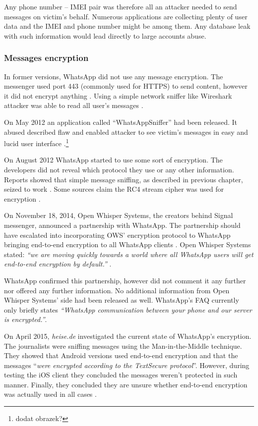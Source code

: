 \documentclass[thesis=M,english]{FITthesis}[2012/10/20]
\begin{document}
Any phone number -- IMEI pair was therefore all an attacker needed to send messages on victim's behalf. Numerous applications are collecting plenty of user data and the IMEI and phone number might be among them. Any database leak with such information would lead directly to large accounts abuse.

\subsubsection{Messages encryption}

In former versions, WhatsApp did not use any message encryption. The messenger used port 443 (commonly used for HTTPS) to send content, however it did not encrypt anything \cite{whatsapp-plaintext}. Using a simple network sniffer like Wireshark attacker was able to read all user's messages \cite{whatsapp-plaintext}.

On May 2012 an application called ``WhatsAppSniffer'' had been released. It abused described flaw and enabled attacker to see victim's messages in easy and lucid user interface \cite{whatsapp-sniffer}\cite{whatsapp-sniffer2}.\footnote{dodat obrazek?}

On August 2012 WhatsApp started to use some sort of encryption. The developers did not reveal which protocol they use or any other information. Reports showed that simple message sniffing, as described in previous chapter, seized to work \cite{whatsapp-sniffernomore}. Some sources claim the  RC4 stream cipher was used for encryption \cite{whatsapp-rc4}\cite{whatsapp-rc42}.

On November 18, 2014, Open Whisper Systems, the creators behind Signal messenger, announced a partnership with WhatsApp. The partnership should have escalated into incorporating OWS' encryption protocol to WhatsApp bringing end-to-end encryption to all WhatsApp clients \cite{openwhisperwhatsapp}. Open Whisper Systems stated: \emph{``we are moving quickly towards a world where all WhatsApp users will get end-to-end encryption by default.''} \cite{openwhisperwhatsapp}.

WhatsApp confirmed this partnership, however did not comment it any further nor offered any further information. No additional information from Open Whisper Systems' side had been released as well. WhatsApp's FAQ currently only briefly states \emph{``WhatsApp communication between your phone and our server is encrypted.''}\cite{whatsapp-faq}.

On April 2015, \emph{heise.de} investigated the current state of WhatsApp's encryption. The journalists were sniffing messages using the Man-in-the-Middle technique. They showed that Android versions used end-to-end encryption and that the messages ``\emph{were encrypted according to the TextSecure protocol}''\cite{whatsapp-encstate}. However, during testing the iOS client they concluded the messages weren't protected in such manner. Finally, they concluded they are unsure whether end-to-end encryption was actually used in all cases \cite{whatsapp-encstate}.
\end{document}
